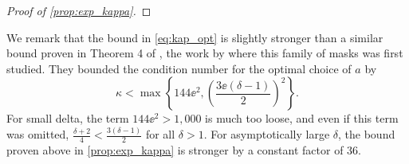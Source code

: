 \begin{proof}[Proof of \cref{prop:exp_kappa}]
\end{proof}

We remark that the bound in \eqref{eq:kap_opt} is slightly stronger than a similar bound proven in Theorem 4 of \cite{IVW2015_FastPhase}, the work by \citeauthor*{IVW2015_FastPhase} where this family of masks was first studied.  They bounded the condition number for the optimal choice of $a$ by \[\kappa < \max\left\{144 \ee^2, \left(\frac{3 \ee (\delta - 1)}{2}\right)^2 \right\}.\]  For small delta, the term $144 \ee^2 > 1,000$ is much too loose, and even if this term was omitted, $\frac{\delta + 2}{4} < \frac{3(\delta - 1)}{2}$ for all $\delta > 1$.  For asymptotically large $\delta$, the bound proven above in \cref{prop:exp_kappa} is stronger by a constant factor of $36$.
